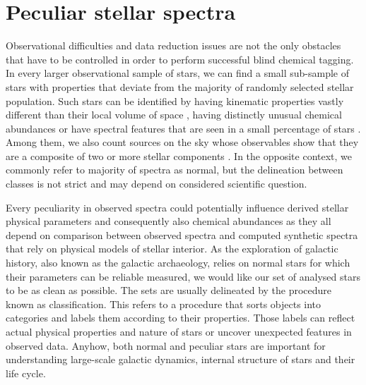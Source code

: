 \section{Peculiar stellar spectra}
Observational difficulties and data reduction issues are not the only obstacles that have to be controlled in order to perform successful blind chemical tagging. In every larger observational sample of stars, we can find a small sub-sample of stars with properties that deviate from the majority of randomly selected stellar population. Such stars can be identified by having kinematic properties vastly different than their local volume of space \cite{2010MNRAS.407.2241K, 2011ApJ...728..102W, 2017arXiv171003763C}, having distinctly unusual chemical abundances \cite{1974ARA&A..12..257P} or have spectral features that are seen in a small percentage of stars \cite{2010AJ....140.1758T, 2017ApJS..228...24T}. Among them, we also count sources on the sky whose observables show that they are a composite of two or more stellar components \cite{2010AJ....140..184M, 2018MNRAS.473.5043E, 2018MNRAS.476..528E}. In the opposite context, we commonly refer to majority of spectra as normal, but the delineation between classes is not strict and may depend on considered scientific question.

Every peculiarity in observed spectra could potentially influence derived stellar physical parameters and consequently also chemical abundances as they all depend on comparison between observed spectra and computed synthetic spectra that rely on physical models of stellar interior. As the exploration of galactic history, also known as the galactic archaeology, relies on normal stars for which their parameters can be reliable measured, we would like our set of analysed stars to be as clean as possible. The sets are usually delineated by the procedure known as classification. This refers to a procedure that sorts objects into categories and labels them according to their properties. Those labels can reflect actual physical properties and nature of stars or uncover unexpected features in observed data. Anyhow, both normal and peculiar stars are important for understanding large-scale galactic dynamics, internal structure of stars and their life cycle.

